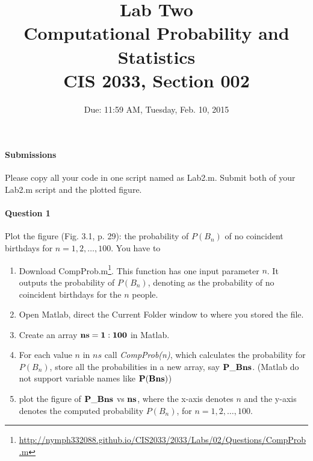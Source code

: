 \documentclass[11pt]{article} %
\title{Lab Two\\
Computational Probability and Statistics \\
CIS 2033, Section 002}
\author{Due: 11:59 AM, Tuesday, Feb. 10, 2015}
\date{} %
\begin{document}
\maketitle

\paragraph*{\bf Submissions} Please copy all your code in one script named as Lab2.m. Submit both of your Lab2.m script and the plotted figure. 

\paragraph*{Question 1}
Plot the figure (Fig. 3.1, p. 29): the probability of $P(B_n)$ of no coincident birthdays for $n=1, 2, \ldots, 100$. You have to 
\begin{enumerate}
\item Download CompProb.m\footnote{\href{http://nymph332088.github.io/CIS2033/2033/Labs/02/Questions/CompProb.m}{http://nymph332088.github.io/CIS2033/2033/Labs/02/Questions/CompProb.m}}. This function has one input parameter $n$. It outputs the probability of $P(B_n)$, denoting as the probability of no coincident birthdays for the $n$ people.
\item Open Matlab, direct the Current Folder window to where you stored the file. 
\item Create an array $\bf ns = 1:100$ in Matlab.
\item For each value $n$ in $ns$ call {\it CompProb(n)}, which calculates the probability for $P(B_n)$, store all the probabilities in a new array, say $\bf P\_Bns$. (Matlab do not support variable names like $\bf P(Bns)$)
\item plot the figure of $\bf P\_Bns$ vs $\bf ns$, where the x-axis denotes $n$ and the y-axis denotes the computed probability $P(B_n)$, for $n = 1, 2, \ldots, 100$.
\end{enumerate}
\end{document}
